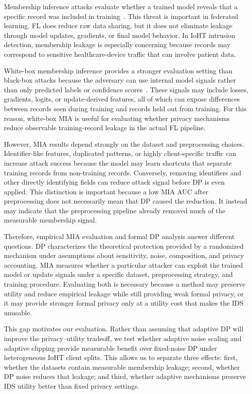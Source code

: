 \documentclass[conference]{IEEEtran}
\begin{document}
Membership inference attacks evaluate whether a trained model reveals that a
specific record was included in training~\cite{shokri2017membership}. This
threat is important in federated learning. FL does reduce raw data sharing, but
it does not eliminate leakage through model updates, gradients, or final model
behavior. In IoHT intrusion detection, membership leakage is especially
concerning because records may correspond to sensitive healthcare-device traffic
that can involve patient data.

White-box membership inference provides a stronger evaluation setting than
black-box attacks because the adversary can use internal model signals rather
than only predicted labels or confidence scores~\cite{nasr2019comprehensive}.
These signals may include losses, gradients, logits, or update-derived
features, all of which can expose differences between records seen during
training and records held out from training. For this reason, white-box MIA is
useful for evaluating whether privacy mechanisms reduce observable
training-record leakage in the actual FL pipeline.

However, MIA results depend strongly on the dataset and preprocessing choices.
Identifier-like features, duplicated patterns, or highly client-specific traffic
can increase attack success because the model may learn shortcuts that separate
training records from non-training records. Conversely, removing identifiers and
other directly identifying fields can reduce attack signal before DP is even
applied. This distinction is important because a low MIA AUC after preprocessing
does not necessarily mean that DP caused the reduction. It instead may indicate
that the preprocessing pipeline already removed much of the measurable
membership signal.

Therefore, empirical MIA evaluation and formal DP analysis answer different
questions. DP characterizes the theoretical protection provided by a randomized
mechanism under assumptions about sensitivity, noise, composition, and privacy
accounting. MIA measures whether a particular attacker can exploit the trained
model or update signals under a specific dataset, preprocessing strategy, and
training procedure. Evaluating both is necessary because a method may preserve
utility and reduce empirical leakage while still providing weak formal privacy,
or it may provide stronger formal privacy only at a utility cost that makes the
IDS unusable.

This gap motivates our evaluation. Rather than assuming that adaptive DP will
improve the privacy--utility tradeoff, we test whether adaptive noise scaling
and adaptive clipping provide measurable benefit over fixed-noise DP under
heterogeneous IoHT client splits. This allows us to separate three effects: first, whether the datasets contain
measurable membership leakage; second, whether DP noise reduces that leakage;
and third, whether adaptive mechanisms preserve IDS utility better than fixed
privacy settings.
\end{document}
